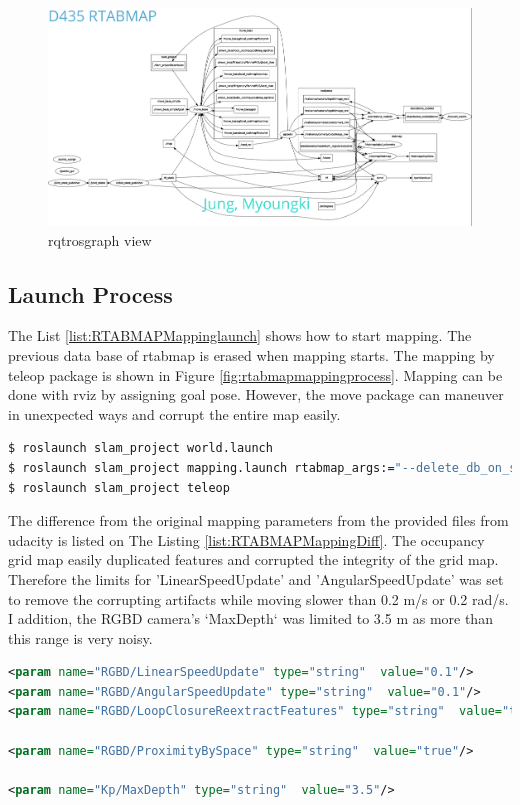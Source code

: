 \documentclass[10pt,journal,compsoc]{IEEEtran}
\begin{document}
\begin{figure}[thpb]
      \centering
      \includegraphics[width=\columnwidth]{./img/rqtrosgraph.png}
      \caption{rqtrosgraph view}
      \label{fig:rqtrosgraph}
\end{figure}

\subsection{Launch Process}
The List \ref{list:RTABMAPMappinglaunch} shows how to start mapping. The previous data base of rtabmap is erased when mapping starts. The mapping by teleop package is shown in Figure \ref{fig:rtabmapmappingprocess}. Mapping can be done with rviz by assigning goal pose. However, the move package can maneuver in unexpected ways and corrupt the entire map easily.
\begin{lstlisting}[language=sh, caption={RTABMAP mapping launch command},label={list:RTABMAPMappinglaunch}]
$ roslaunch slam_project world.launch
$ roslaunch slam_project mapping.launch rtabmap_args:="--delete_db_on_start" rtabmapviz:=false rviz:=true
$ roslaunch slam_project teleop
\end{lstlisting}

The difference from the original mapping parameters from the provided files from udacity is listed on The Listing \ref{list:RTABMAPMappingDiff}. The occupancy grid map easily duplicated features and corrupted the integrity of the grid map. Therefore the limits for 'LinearSpeedUpdate' and 'AngularSpeedUpdate' was set to remove the corrupting artifacts while moving slower than 0.2 m/s or 0.2 rad/s. I addition, the RGBD camera's `MaxDepth` was limited to 3.5 m as more than this range is very noisy.
\begin{lstlisting}[language=XML, caption={Diff RTABMAP mapping.launch},label={list:RTABMAPMappingDiff}]
<param name="RGBD/LinearSpeedUpdate" type="string"  value="0.1"/>
<param name="RGBD/AngularSpeedUpdate" type="string"  value="0.1"/>
<param name="RGBD/LoopClosureReextractFeatures" type="string"  value="true"/>

<param name="RGBD/ProximityBySpace" type="string"  value="true"/>

<param name="Kp/MaxDepth" type="string"  value="3.5"/>  
\end{lstlisting}
\end{document}
